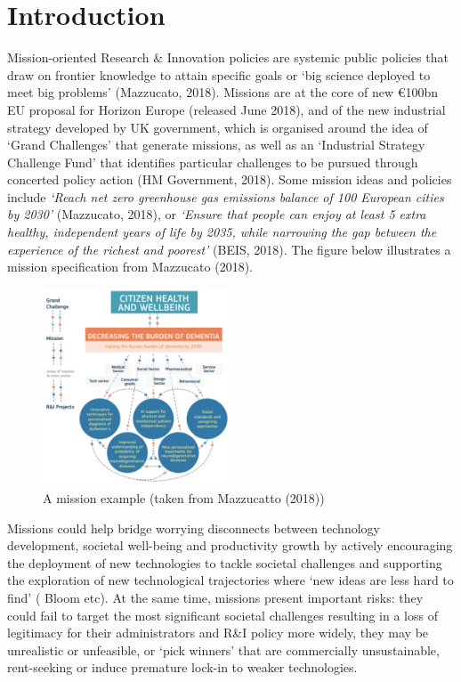 \documentclass[11pt]{article}
\begin{document}
\section{Introduction}
\label{sec:introduction}

Mission-oriented Research \& Innovation policies are systemic public policies that draw on frontier knowledge to attain specific goals or `big science deployed to meet big problems' (Mazzucato, 2018). Missions are at the core of new €100bn EU proposal for Horizon Europe (released June 2018), and of the new industrial strategy developed by UK government, which is organised around the idea of `Grand Challenges’ that generate missions, as well as an `Industrial Strategy Challenge Fund’ that identifies particular challenges to be pursued through concerted policy action (HM Government, 2018). Some mission ideas and policies include \textit{`Reach net zero greenhouse gas emissions balance of 100 European cities
by 2030'} (Mazzucato, 2018), or \textit{`Ensure that people can enjoy at least 5 extra healthy, independent years of life by 2035, while narrowing the gap between the experience of the richest and poorest'} (BEIS, 2018). The figure below illustrates a mission specification from Mazzucato (2018).

\begin{figure}[!ht]
    \centering
    \includegraphics[width=0.5\textwidth]{figures/fig1_example.png}
    \caption{A mission example (taken from Mazzucatto (2018))}
    \label{fig:mission_example}
\end{figure}

Missions could help bridge worrying disconnects between technology development, societal well-being and productivity growth by actively encouraging the deployment of new technologies to tackle societal challenges and supporting the exploration of new technological trajectories where `new ideas are less hard to find' ( Bloom etc). At the same time, missions present important risks: they could fail to target the most significant societal challenges resulting in a loss of legitimacy for their administrators and R\&I policy more widely, they may be unrealistic or unfeasible, or `pick winners' that are commercially unsustainable, rent-seeking or induce premature lock-in to weaker technologies. 
\end{document}
